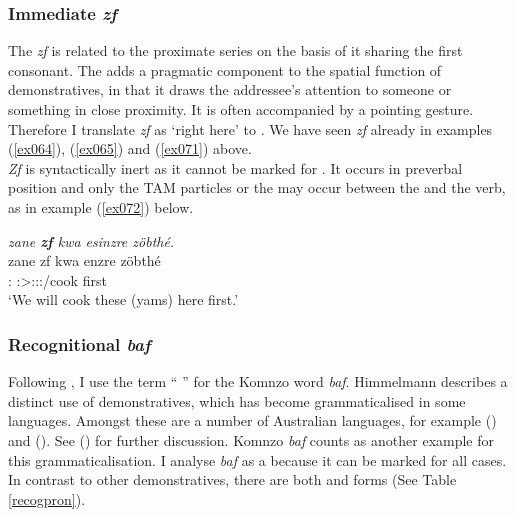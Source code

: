 \subsubsection{Immediate \emph{zf}} \label{immediate-dem}

The   \emph{zf} is related to the proximate series on the basis of it sharing the first consonant. The  adds a pragmatic component to the spatial function of demonstratives, in that it draws the addressee's attention to someone or something in close proximity. It is often accompanied by a pointing gesture. Therefore I translate \emph{zf} as `right here' to . We have seen \emph{zf} already in examples (\ref{ex064}), (\ref{ex065}) and (\ref{ex071}) above.\\

\emph{Zf} is syntactically inert as it cannot be marked for . It occurs in preverbal position and only the TAM particles or the  may occur between the   and the verb, as in example (\ref{ex072}) below.

\begin{exe}
	\ex \emph{zane \textbf{zf} kwa esinzre zöbthé.}\\
	\gll zane zf kwa enzre zöbthé\\
	\Dem{}:\Prox{} \Imm{} \Fut{} \Fpl:\Sbj>\Stpl:\Obj:\Nonpast:\Ipfv/cook first\\
	\trans `We will cook these (yams) here first.'
	\label{ex072}
\end{exe}

\subsubsection{Recognitional \emph{baf}} \label{recognitional-pronoun}

Following \citep{Himmelmann:1996tp}, I use the term `` '' for the Komnzo word \textit{baf}. Himmelmann describes a distinct  use of demonstratives, which has become grammaticalised in some languages. Amongst these are a number of Australian languages, for example  (\citealt{Heath:1984uk}) and  (\citealt{Goddard:1985tw}). See (\citealt[231ff.]{Himmelmann:1996tp}) for further discussion. Komnzo \emph{baf} counts as another example for this grammaticalisation. I analyse \emph{baf} as a  because it can be marked for all cases. In contrast to other demonstratives, there are both  and  forms (See Table \ref{recogpron}).\\

